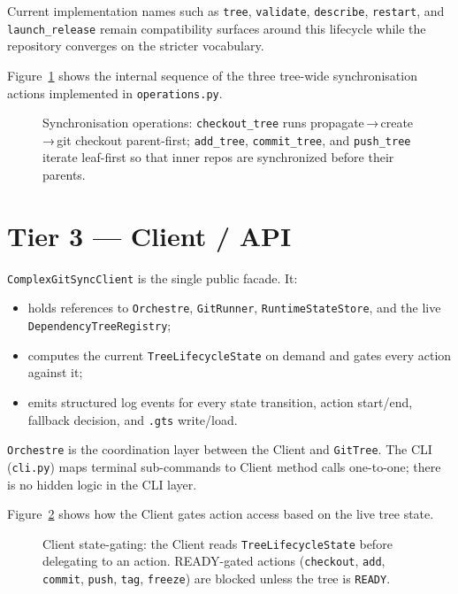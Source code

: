 Current implementation names such as \texttt{tree}, \texttt{validate},
\texttt{describe}, \texttt{restart}, and \texttt{launch\_release} remain
compatibility surfaces around this lifecycle while the repository converges on
the stricter vocabulary.

Figure~\ref{fig:ops-sequence} shows the internal sequence of the three
tree-wide synchronisation actions implemented in \texttt{operations.py}.

\begin{figure}[ht]
\centering
\caption{Synchronisation operations: \texttt{checkout\_tree} runs
  propagate\,→\,create\,→\,git checkout parent-first; \texttt{add\_tree},
  \texttt{commit\_tree}, and \texttt{push\_tree} iterate leaf-first so that
  inner repos are synchronized before their parents.}
\label{fig:ops-sequence}

\end{figure}

\section{Tier 3 — Client / API}
\label{sec:tier-client}

\texttt{ComplexGitSyncClient} is the single public facade.  It:

\begin{itemize}
  \item holds references to \texttt{Orchestre}, \texttt{GitRunner},
    \texttt{RuntimeStateStore}, and the live \texttt{DependencyTreeRegistry};
  \item computes the current \texttt{TreeLifecycleState} on demand and gates
    every action against it;
  \item emits structured log events for every state transition, action start/end,
    fallback decision, and \texttt{.gts} write/load.
\end{itemize}

\texttt{Orchestre} is the coordination layer between the Client and
\texttt{GitTree}.  The CLI (\texttt{cli.py}) maps terminal sub-commands to
Client method calls one-to-one; there is no hidden logic in the CLI layer.

Figure~\ref{fig:client-gating} shows how the Client gates action access based
on the live tree state.

\begin{figure}[ht]
\centering
\caption{Client state-gating: the Client reads \texttt{TreeLifecycleState}
  before delegating to an action.  READY-gated actions (\texttt{checkout},
  \texttt{add}, \texttt{commit}, \texttt{push}, \texttt{tag},
  \texttt{freeze}) are blocked unless the tree is \texttt{READY}.}
\label{fig:client-gating}

\end{figure}

